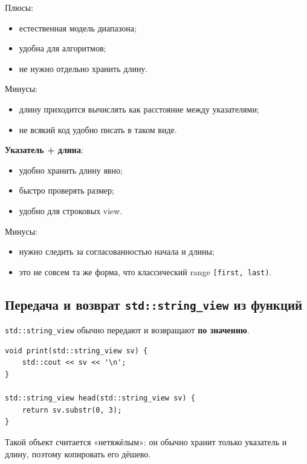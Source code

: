 Плюсы:
\begin{itemize}
    \item естественная модель диапазона;
    \item удобна для алгоритмов;
    \item не нужно отдельно хранить длину.
\end{itemize}

Минусы:
\begin{itemize}
    \item длину приходится вычислять как расстояние между указателями;
    \item не всякий код удобно писать в таком виде.
\end{itemize}

\textbf{Указатель + длина}:
\begin{itemize}
    \item удобно хранить длину явно;
    \item быстро проверять размер;
    \item удобно для строковых view.
\end{itemize}

Минусы:
\begin{itemize}
    \item нужно следить за согласованностью начала и длины;
    \item это не совсем та же форма, что классический range \texttt{[first, last)}.
\end{itemize}

\subsection{Передача и возврат \texttt{std::string\_view} из функций}
\texttt{std::string\_view} обычно передают и возвращают \textbf{по значению}.

\begin{example}
\begin{verbatim}
void print(std::string_view sv) {
    std::cout << sv << '\n';
}

std::string_view head(std::string_view sv) {
    return sv.substr(0, 3);
}
\end{verbatim}
\end{example}

\begin{remark}
Такой объект считается «нетяжёлым»: он обычно хранит только указатель и длину, поэтому копировать его дёшево.
\end{remark}

